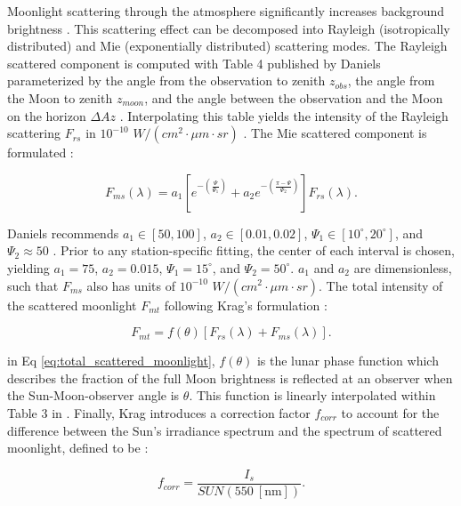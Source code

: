Moonlight scattering through the atmosphere significantly increases background brightness \cite{krag2003}. This scattering effect can be decomposed into Rayleigh (isotropically distributed) and Mie (exponentially distributed) scattering modes. The Rayleigh scattered component is computed with Table 4 published by Daniels parameterized by the angle from the observation to zenith $z_{obs}$, the angle from the Moon to zenith $z_{moon}$, and the angle between the observation and the Moon on the horizon $\Delta Az$ \cite{daniels1977}. Interpolating this table yields the intensity of the Rayleigh scattering $F_{rs}$ in $10^{-10}$ $W/(cm^2 \cdot \mu m \cdot sr)$ \cite{krag2003}. The Mie scattered component is formulated \cite{krag2003}:

\begin{equation} \label{eq:mie_scattering_moon}
  F_{ms}(\lambda) = a_1 \left[ e^{-\left(\frac{\Psi}{\Psi_1}\right)} + a_2 e^{-\left(\frac{\pi - \Psi}{\Psi_2}\right)} \right] F_{rs}(\lambda).
\end{equation}

Daniels recommends $a_1 \in [50, 100]$, $a_2 \in [0.01, 0.02]$, $\Psi_1 \in [10^\circ, 20^\circ]$, and $\Psi_2 \approx 50$ \cite{daniels1977}. Prior to any station-specific fitting, the center of each interval is chosen, yielding $a_1 = 75$, $a_2 = 0.015$, $\Psi_1 = 15^\circ$, and $\Psi_2 = 50^\circ$. $a_1$ and $a_2$ are dimensionless, such that $F_{ms}$ also has units of $10^{-10}$ $W/(cm^2 \cdot \mu m \cdot sr)$. The total intensity of the scattered moonlight $F_{mt}$ following Krag's formulation \cite{krag2003}:

\begin{equation} \label{eq:total_scattered_moonlight}
  F_{mt} = f(\theta) \left[ F_{rs}(\lambda) + F_{ms}(\lambda) \right].
\end{equation}

in Eq \ref{eq:total_scattered_moonlight}, $f(\theta)$ is the lunar phase function which describes the fraction of the full Moon brightness is reflected at an observer when the Sun-Moon-observer angle is $\theta$. This function is linearly interpolated within Table 3 in \cite{daniels1977}. Finally, Krag introduces a correction factor $f_{corr}$ to account for the difference between the Sun's irradiance spectrum and the spectrum of scattered moonlight, defined to be \cite{krag2003}:

\begin{equation} \label{eq:krag_f_corr}
  f_{corr} = \frac{I_s}{SUN(550 \: \left[\textrm{nm}\right])}.
\end{equation}

